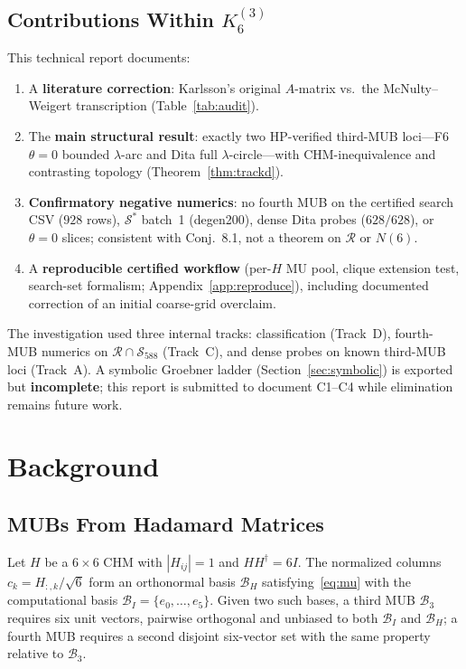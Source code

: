 \documentclass[onecolumn]{IEEEtran}
\begin{document}
\subsection{Contributions Within $K_6^{(3)}$}
This technical report documents:
\begin{enumerate}
    \item[\textbf{C1}] A \textbf{literature correction}: Karlsson's original $A$-matrix vs.\ the McNulty--Weigert transcription (Table~\ref{tab:audit}).
    \item[\textbf{C2}] The \textbf{main structural result}: exactly two HP-verified third-MUB loci---F6 $\theta{=}0$ bounded $\lambda$-arc and Dita full $\lambda$-circle---with CHM-inequivalence and contrasting topology (Theorem~\ref{thm:trackd}).
    \item[\textbf{C3}] \textbf{Confirmatory negative numerics}: no fourth MUB on the certified search CSV ($928$ rows), $\mathcal{S}^*$ batch~1 (degen200), dense Dita probes ($628/628$), or $\theta{=}0$ slices; consistent with Conj.~8.1, not a theorem on $\mathcal{R}$ or $N(6)$.
    \item[\textbf{C4}] A \textbf{reproducible certified workflow} (per-$H$ MU pool, clique extension test, search-set formalism; Appendix~\ref{app:reproduce}), including documented correction of an initial coarse-grid overclaim.
\end{enumerate}
The investigation used three internal tracks: classification (Track~D), fourth-MUB numerics on $\mathcal{R}\cap\mathcal{S}_{588}$ (Track~C), and dense probes on known third-MUB loci (Track~A).
A symbolic Groebner ladder (Section~\ref{sec:symbolic}) is exported but \textbf{incomplete}; this report is submitted to document C1--C4 while elimination remains future work.

\section{Background}
\label{sec:background}

\subsection{MUBs From Hadamard Matrices}
Let $H$ be a $6\times6$ CHM with $|H_{ij}|=1$ and $HH^\dagger=6I$.
The normalized columns $c_k=H_{:,k}/\sqrt{6}$ form an orthonormal basis $\mathcal{B}_H$ satisfying~\eqref{eq:mu} with the computational basis $\mathcal{B}_I=\{e_0,\ldots,e_5\}$.
Given two such bases, a third MUB $\mathcal{B}_3$ requires six unit vectors, pairwise orthogonal and unbiased to both $\mathcal{B}_I$ and $\mathcal{B}_H$; a fourth MUB requires a second disjoint six-vector set with the same property relative to $\mathcal{B}_3$.
\end{document}
